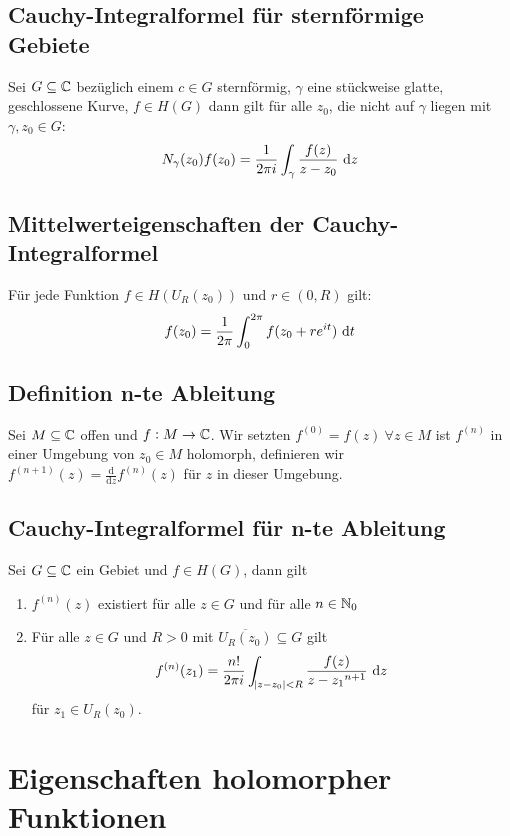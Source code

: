 \subsection{Cauchy-Integralformel für sternförmige Gebiete}
Sei $G \subseteq \mathbb{C}$ bezüglich einem $c \in G$ sternförmig, $\gamma$ eine stückweise glatte, geschlossene Kurve,
$f \in H(G)$ dann gilt für alle $z_0$, die nicht auf $\gamma$ liegen mit $\gamma, z_0 \in G$:
\begin{equation*}
    N_\gamma (z_0) f(z_0) = \frac{1}{2 \pi i} \int_\gamma \frac{f(z)}{z-z_0} \text{ d}z
\end{equation*}

\subsection{Mittelwerteigenschaften der Cauchy-Integralformel}
Für jede Funktion $f \in H(U_R(z_0))$ und $r \in (0, R)$ gilt:
\begin{equation*}
    f(z_0) = \frac{1}{2 \pi} \int_0^{2\pi} f(z_0 + r e^{it}) \text{ d}t
\end{equation*}

\subsection{Definition n-te Ableitung}
Sei $M \subseteq \mathbb{C}$ offen und $f: M \to \mathbb{C}$. Wir setzten $f^{(0)} = f(z)\ \forall z \in M$ ist $f^{(n)}$ in einer
Umgebung von $z_0 \in M$ holomorph, definieren wir 
$f^{(n+1)}(z) = \frac{\text{d}}{\text{d}z} f^{(n)}(z)$ für $z$ in dieser Umgebung.

\subsection{Cauchy-Integralformel für n-te Ableitung}
Sei $G \subseteq \mathbb{C}$ ein Gebiet und $f \in H(G)$, dann gilt
\begin{enumerate}
    \item $f^{(n)}(z)$ existiert für alle $z \in G$ und für alle $n \in \mathbb{N}_0$
    \item Für alle $z \in G$ und $R > 0$ mit $\overline{U_R(z_0)} \subseteq G$ gilt
        \begin{equation*}
            f^{(n)}(z_1) = \frac{n!}{2 \pi i} \int_{\abs{z-z_0} < R} \frac{f(z)}{{z-z_1}^{n+1}} \text{ d}z
        \end{equation*}
        für $z_1 \in U_R(z_0)$.
\end{enumerate}

\section{Eigenschaften holomorpher Funktionen}
